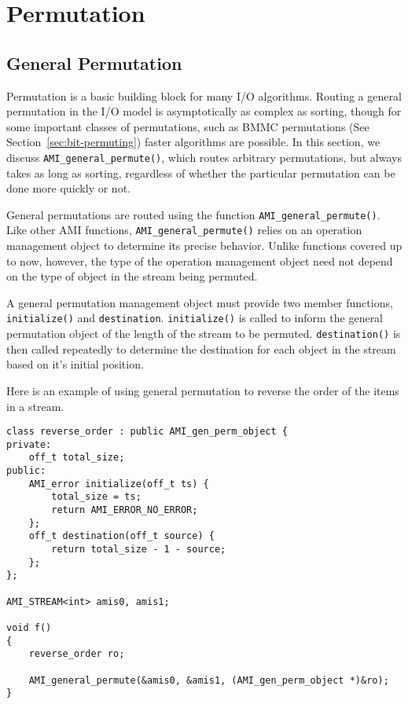 \section{Permutation}

\subsection{General Permutation}

Permutation is a basic building block for many I/O algorithms.
Routing a general permutation in the I/O model is asymptotically as
complex as sorting, though for some important classes of permutations,
such as BMMC permutations (See Section~\ref{sec:bit-permuting}) faster
algorithms are possible.  In this section, we discuss
\verb|AMI_general_permute()|, which routes arbitrary permutations, but
always takes as long as sorting, regardless of whether the particular
permutation can be done more quickly or not.

General permutations are routed using the function
\verb|AMI_general_permute()|.  Like other AMI functions,
\verb|AMI_general_permute()| relies on an operation management
object to determine its precise
behavior.  Unlike functions covered up to now, however, the type of
the operation management object
need not depend on the type of object in the stream being permuted.

A general permutation management object must provide two member
functions, \verb|initialize()| and \verb|destination|.
\verb|initialize()| is called to inform the general permutation object
of the length of the stream to be permuted.  \verb|destination()| is
then called repeatedly to determine the destination for each object in
the stream based on it's initial position.

Here is an example of using general permutation to reverse the order
of the items in a stream.

\begin{verbatim}
class reverse_order : public AMI_gen_perm_object {
private:
    off_t total_size;
public:
    AMI_error initialize(off_t ts) { 
        total_size = ts; 
        return AMI_ERROR_NO_ERROR;
    };
    off_t destination(off_t source) {
        return total_size - 1 - source;
    };
};

AMI_STREAM<int> amis0, amis1;    

void f()
{
    reverse_order ro;

    AMI_general_permute(&amis0, &amis1, (AMI_gen_perm_object *)&ro);
}
\end{verbatim}

